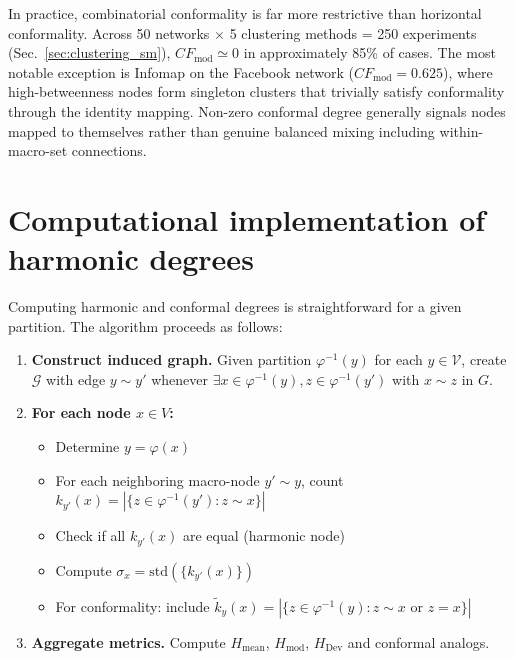 \documentclass[twocolumn,superscriptaddress,tightenlines,aps,prx,floatfix]{revtex4-2}
\begin{document}
\begin{bibunit}
In practice, combinatorial conformality is far more restrictive than horizontal conformality. Across 50 networks $\times$ 5 clustering methods = 250 experiments (Sec.~\ref{sec:clustering_sm}), $CF_{\text{mod}}\simeq 0$ in approximately 85\% of cases. The most notable exception is Infomap on the Facebook network ($CF_{\text{mod}} = 0.625$), where high-betweenness nodes form singleton clusters that trivially satisfy conformality through the identity mapping. Non-zero conformal degree generally signals nodes mapped to themselves rather than genuine balanced mixing including within-macro-set connections.


\section{Computational implementation of harmonic degrees}
\label{sec:computational_sm}

Computing harmonic and conformal degrees is straightforward for a given partition. The algorithm proceeds as follows:

\begin{enumerate}
\item \textbf{Construct induced graph.} Given partition $\varphi^{-1}(y)$ for each $y \in \mathcal{V}$, create $\mathcal{G}$ with edge $y \sim y'$ whenever $\exists x \in \varphi^{-1}(y), z \in \varphi^{-1}(y')$ with $x \sim z$ in $G$.

\item \textbf{For each node $x \in V$:}
\begin{itemize}
\item Determine $y = \varphi(x)$
\item For each neighboring macro-node $y' \sim y$, count $k_{y'}(x) = |\{z \in \varphi^{-1}(y') : z \sim x\}|$
\item Check if all $k_{y'}(x)$ are equal (harmonic node)
\item Compute $\sigma_x = \text{std}(\{k_{y'}(x)\})$
\item For conformality: include $\tilde{k}_y(x) = |\{z \in \varphi^{-1}(y) : z \sim x \text{ or } z=x\}|$
\end{itemize}

\item \textbf{Aggregate metrics.} Compute $H_{\text{mean}}$, $H_{\text{mod}}$, $H_{\text{Dev}}$ and conformal analogs.
\end{enumerate}



\end{bibunit}
\end{document}
